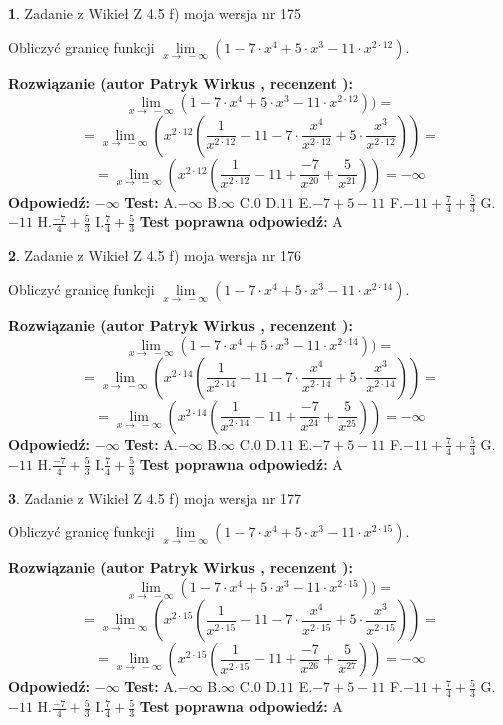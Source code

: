 \documentclass[12pt, a4paper]{article}
\theoremstyle{definition} %
\newtheorem{zad}{}
\newcommand{\zadStart}[1]{\begin{zad}#1\newline}
\newcommand{\zadStop}{\end{zad}}
\newcommand{\rozwStart}[2]{\noindent \textbf{Rozwiązanie (autor #1 , recenzent #2): }\newline}
\newcommand{\rozwStop}{\newline}
\newcommand{\odpStart}{\noindent \textbf{Odpowiedź:}\newline}
\newcommand{\odpStop}{\newline}
\newcommand{\testStart}{\noindent \textbf{Test:}\newline}
\newcommand{\testStop}{\newline}
\newcommand{\kluczStart}{\noindent \textbf{Test poprawna odpowiedź:}\newline}
\newcommand{\kluczStop}{\newline}
\begin{document}
\zadStart{Zadanie z Wikieł Z 4.5 f) moja wersja nr 175}



Obliczyć granicę funkcji  $\lim\limits_{x\to\ -\infty}(1 - 7 \cdot x^{4}+5 \cdot x^{3}- 11 \cdot x^{2\cdot12})$.
\zadStop
\rozwStart{Patryk Wirkus}{}
$$\lim\limits_{x\to\ -\infty}(1 - 7 \cdot x^{4}+5 \cdot x^{3}- 11 \cdot x^{2\cdot12}))=$$
$$=\lim\limits_{x\to\ -\infty}(x^{2\cdot12}(\frac{1}{x^{2\cdot12}}-11 -7 \cdot \frac{x^{4}}{x^{2\cdot12}}+5 \cdot \frac{x^{3}}{x^{2\cdot12}}))=$$
$$=\lim\limits_{x\to\ -\infty}(x^{2\cdot12}(\frac{1}{x^{2\cdot12}}-11 + \frac{-7}{x^{20}}+ \frac{5}{x^{21}}))=-\infty$$
\rozwStop
\odpStart
$-\infty$
\odpStop
\testStart
A.$-\infty$ B.$\infty$ C.$0$ D.$11$ E.$-7 + 5 - 11$
F.$-11+\frac{7}{4}+\frac{5}{3}$ G.$-11$
H.$\frac{-7}{4}+\frac{5}{3}$
I.$\frac{7}{4}+\frac{5}{3}$
\testStop
\kluczStart
A
\kluczStop



\zadStart{Zadanie z Wikieł Z 4.5 f) moja wersja nr 176}



Obliczyć granicę funkcji  $\lim\limits_{x\to\ -\infty}(1 - 7 \cdot x^{4}+5 \cdot x^{3}- 11 \cdot x^{2\cdot14})$.
\zadStop
\rozwStart{Patryk Wirkus}{}
$$\lim\limits_{x\to\ -\infty}(1 - 7 \cdot x^{4}+5 \cdot x^{3}- 11 \cdot x^{2\cdot14}))=$$
$$=\lim\limits_{x\to\ -\infty}(x^{2\cdot14}(\frac{1}{x^{2\cdot14}}-11 -7 \cdot \frac{x^{4}}{x^{2\cdot14}}+5 \cdot \frac{x^{3}}{x^{2\cdot14}}))=$$
$$=\lim\limits_{x\to\ -\infty}(x^{2\cdot14}(\frac{1}{x^{2\cdot14}}-11 + \frac{-7}{x^{24}}+ \frac{5}{x^{25}}))=-\infty$$
\rozwStop
\odpStart
$-\infty$
\odpStop
\testStart
A.$-\infty$ B.$\infty$ C.$0$ D.$11$ E.$-7 + 5 - 11$
F.$-11+\frac{7}{4}+\frac{5}{3}$ G.$-11$
H.$\frac{-7}{4}+\frac{5}{3}$
I.$\frac{7}{4}+\frac{5}{3}$
\testStop
\kluczStart
A
\kluczStop



\zadStart{Zadanie z Wikieł Z 4.5 f) moja wersja nr 177}



Obliczyć granicę funkcji  $\lim\limits_{x\to\ -\infty}(1 - 7 \cdot x^{4}+5 \cdot x^{3}- 11 \cdot x^{2\cdot15})$.
\zadStop
\rozwStart{Patryk Wirkus}{}
$$\lim\limits_{x\to\ -\infty}(1 - 7 \cdot x^{4}+5 \cdot x^{3}- 11 \cdot x^{2\cdot15}))=$$
$$=\lim\limits_{x\to\ -\infty}(x^{2\cdot15}(\frac{1}{x^{2\cdot15}}-11 -7 \cdot \frac{x^{4}}{x^{2\cdot15}}+5 \cdot \frac{x^{3}}{x^{2\cdot15}}))=$$
$$=\lim\limits_{x\to\ -\infty}(x^{2\cdot15}(\frac{1}{x^{2\cdot15}}-11 + \frac{-7}{x^{26}}+ \frac{5}{x^{27}}))=-\infty$$
\rozwStop
\odpStart
$-\infty$
\odpStop
\testStart
A.$-\infty$ B.$\infty$ C.$0$ D.$11$ E.$-7 + 5 - 11$
F.$-11+\frac{7}{4}+\frac{5}{3}$ G.$-11$
H.$\frac{-7}{4}+\frac{5}{3}$
I.$\frac{7}{4}+\frac{5}{3}$
\testStop
\kluczStart
A
\kluczStop
\end{document}
